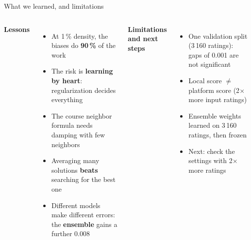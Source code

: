 \documentclass[aspectratio=169,11pt]{beamer}
\newcommand{\key}[1]{\textcolor{accent}{\textbf{#1}}}
\begin{document}
\begin{frame}{What we learned, and limitations}
\begin{columns}[T]
\textbf{Lessons}
\begin{itemize}
  \item At 1\,\% density, the biases do \key{90\,\%} of the work
  \item The risk is \key{learning by heart}: regularization decides everything
  \item The course neighbor formula needs damping with few neighbors
  \item Averaging many solutions \key{beats} searching for the best one
  \item Different models make different errors: the \key{ensemble} gains a further 0.008
\end{itemize}
\textbf{Limitations and next steps}
\begin{itemize}
  \item One validation split (3\,160 ratings): gaps of 0.001 are not significant
  \item Local score $\neq$ platform score (2$\times$ more input ratings)
  \item Ensemble weights learned on 3\,160 ratings, then frozen
  \item Next: check the settings with 2$\times$ more ratings
\end{itemize}
\end{columns}
\end{frame}
\end{document}
